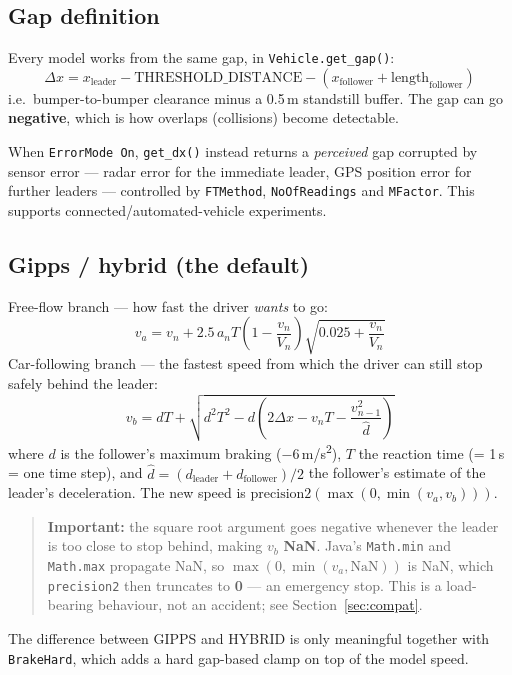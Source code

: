 \documentclass[11pt, a4paper]{article}
\newcommand{\code}[1]{\texttt{#1}}
\begin{document}
\subsection{Gap definition}

Every model works from the same gap, in \code{Vehicle.get\_gap()}:
\[
    \Delta x = x_{\text{leader}} - \text{THRESHOLD\_DISTANCE}
             - \left(x_{\text{follower}} + \text{length}_{\text{follower}}\right)
\]
i.e.\ bumper-to-bumper clearance minus a 0.5\,m standstill buffer. The gap can go
\textbf{negative}, which is how overlaps (collisions) become detectable.

When \code{ErrorMode On}, \code{get\_dx()} instead returns a \emph{perceived} gap
corrupted by sensor error --- radar error for the immediate leader, GPS position
error for further leaders --- controlled by \code{FTMethod},
\code{NoOfReadings} and \code{MFactor}. This supports connected/automated-vehicle
experiments.

\subsection{Gipps / hybrid (the default)}

Free-flow branch --- how fast the driver \emph{wants} to go:
\[
    v_a = v_n + 2.5\,a_n T \left(1 - \frac{v_n}{V_n}\right)
          \sqrt{0.025 + \frac{v_n}{V_n}}
\]
Car-following branch --- the fastest speed from which the driver can still stop
safely behind the leader:
\[
    v_b = d T + \sqrt{d^2T^2 - d\left(2\Delta x - v_n T
          - \frac{v_{n-1}^2}{\hat d}\right)}
\]
where $d$ is the follower's maximum braking ($-6$\,m/s\textsuperscript{2}), $T$
the reaction time (= 1\,s = one time step), and
$\hat d = (d_{\text{leader}} + d_{\text{follower}})/2$ the follower's estimate of
the leader's deceleration. The new speed is
$\text{precision2}\left(\max(0, \min(v_a, v_b))\right)$.

\begin{quote}
\textbf{Important:} the square root argument goes negative whenever the leader is
too close to stop behind, making $v_b$ \textbf{NaN}. Java's \code{Math.min} and
\code{Math.max} propagate NaN, so $\max(0, \min(v_a, \text{NaN}))$ is NaN, which
\code{precision2} then truncates to \textbf{0} --- an emergency stop. This is a
load-bearing behaviour, not an accident; see Section~\ref{sec:compat}.
\end{quote}

The difference between GIPPS and HYBRID is only meaningful together with
\code{BrakeHard}, which adds a hard gap-based clamp on top of the model speed.
\end{document}
